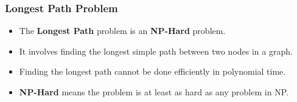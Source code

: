 \documentclass[10pt,aspectratio=43]{beamer}
\begin{document}
\begin{frame}
    \frametitle{Longest Path Problem}
    \begin{itemize}
        \item The \textbf{Longest Path} problem is an \textbf{NP-Hard} problem.
        \item It involves finding the longest simple path between two nodes in a graph.
        \item Finding the longest path cannot be done efficiently in polynomial time.
        \item \textbf{NP-Hard} means the problem is at least as hard as any problem in NP.
    \end{itemize}
\end{frame}
%
%
%
%
%
\end{document}
